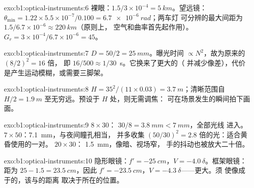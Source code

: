 \begin{solution}{exo:b1:optical-instruments:6}
裸眼：$1.5/3\times10^{-4} = \qty{5}{km}$。望远镜：$\theta_{\min}
= 1.22 \times 5.5\times10^{-7}/0.100 = \qty{6.7e-6}{rad}$；两车灯
可分辨的最大间距为 $1.5/6.7\times10^{-6} \approx \qty{220}{km}$（原则上，
空气和曲率首先起作用）。$G_r = 3\times10^{-4}/
6.7\times10^{-6} = 45$。
\end{solution}

\begin{solution}{exo:b1:optical-instruments:7}
$D = 50/2 = \qty{25}{mm}$。曝光时间 $\propto N^2$，故为原来的 $(8/2)^2 = 16$ 倍，
即 $16/500 \approx 1/30$~\unit{s}。它换来了更大的（
并减少像差），代价是产生运动模糊，或需要三脚架。
\end{solution}

\begin{solution}{exo:b1:optical-instruments:8}
$H = 35^2/(11 \times 0.03) = \qty{3.7}{m}$；清晰范围自 $H/2 =
\qty{1.9}{m}$ 至无穷远。预设于 $H$ 处，则无需调焦：
可在场景发生的瞬间拍下画面。
\end{solution}

\begin{solution}{exo:b1:optical-instruments:9}
$8\times30$： $30/8 = \qty{3.8}{mm} < \qty{7}{mm}$，全部光线
进入。$7\times50$：\qty{7.1}{mm}，与夜间瞳孔相当，
并多收集 $(50/30)^2 = 2.8$ 倍的光：适合黄昏使用的一对。
$20\times30$： \qty{1.5}{mm}，像暗、视场窄，
手的抖动也被放大二十倍。
\end{solution}

\begin{solution}{exo:b1:optical-instruments:10}
隐形眼镜：$f' = \qty{-25}{cm}$，$V = \qty{-4.0}{\delta}$。框架眼镜：
距为 $25 - 1.5 = \qty{23.5}{cm}$，因此 $f' =
\qty{-23.5}{cm}$，$V = \qty{-4.3}{\delta}$——更大。须
使像成于的，该与的距离
取决于所在的位置。
\end{solution}

